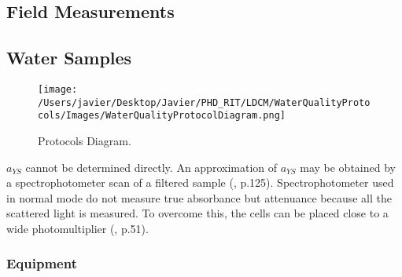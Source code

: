 \begin{appendices}
\chapter{Field Measurements}
\label{ch:fieldmea}
\section{Water Samples}
\begin{figure}[h]
\centering
    \texttt{[image: /Users/javier/Desktop/Javier/PHD\_RIT/LDCM/WaterQualityProtocols/Images/WaterQualityProtocolDiagram.png]}%
    \vspace{0.5cm}
   \caption[]{\label{fig:ProtocolsDiagram} Protocols Diagram.}
\end{figure}

$a_{YS}$ cannot be determined directly. An approximation of $a_{YS}$ may be obtained by a spectrophotometer scan of a filtered sample (\cite{Bukata1995}, p.125). Spectrophotometer used in normal mode do not measure true absorbance but {\color{red} attenuance} because all the scattered light is measured. To overcome this, the cells can be placed close to a wide photomultiplier (\cite{Kirk1983}, p.51).

\subsection{Equipment}


\end{appendices}
